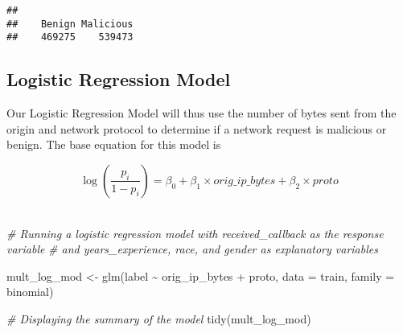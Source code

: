 \documentclass[
]{article}
\newenvironment{Shaded}{\begin{snugshade}}{\end{snugshade}}
\newcommand{\AttributeTok}[1]{\textcolor[rgb]{0.77,0.63,0.00}{#1}}
\newcommand{\CommentTok}[1]{\textcolor[rgb]{0.56,0.35,0.01}{\textit{#1}}}
\newcommand{\FunctionTok}[1]{\textcolor[rgb]{0.00,0.00,0.00}{#1}}
\newcommand{\NormalTok}[1]{#1}
\newcommand{\OtherTok}[1]{\textcolor[rgb]{0.56,0.35,0.01}{#1}}
\newcommand{\SpecialCharTok}[1]{\textcolor[rgb]{0.00,0.00,0.00}{#1}}
\begin{document}
\begin{Shaded}
\end{Shaded}

\begin{verbatim}
## 
##    Benign Malicious 
##    469275    539473
\end{verbatim}

\hypertarget{logistic-regression-model}{%
\subsection{Logistic Regression Model}\label{logistic-regression-model}}

Our Logistic Regression Model will thus use the number of bytes sent
from the origin and network protocol to determine if a network request
is malicious or benign. The base equation for this model is

\[
\begin{equation*}
\log\left(\frac{p_i}{1-p_i}\right) = \beta_0 + \beta_1 \times orig\_ip\_bytes + \beta_2 \times proto
\end{equation*}
\]\\

\begin{Shaded}
\begin{Highlighting}[]
\CommentTok{\# Running a logistic regression model with received\_callback as the response variable}
\CommentTok{\# and years\_experience, race, and gender as explanatory variables}

\NormalTok{mult\_log\_mod }\OtherTok{\textless{}{-}} \FunctionTok{glm}\NormalTok{(label }\SpecialCharTok{\textasciitilde{}}\NormalTok{ orig\_ip\_bytes }\SpecialCharTok{+}\NormalTok{ proto, }
                      \AttributeTok{data =}\NormalTok{ train, }
                      \AttributeTok{family =}\NormalTok{ binomial)}

\CommentTok{\# Displaying the summary of the model}
\FunctionTok{tidy}\NormalTok{(mult\_log\_mod)}
\end{Highlighting}
\end{Shaded}
\end{document}
